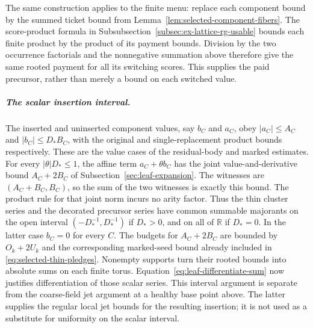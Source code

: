 The same construction applies to the finite menu: replace each
component bound by the summed ticket bound from
Lemma~\ref{lem:selected-component-fibers}. The score-product formula
in Subsubsection~\ref{subsec:ex-lattice-rg-usable} bounds each finite product
by the product of its payment bounds. Division by the two occurrence
factorials and the nonnegative summation above therefore give the
same rooted payment for all its switching scores. This supplies the
paid precursor, rather than merely a bound on each switched value.

\subparagraph{The scalar insertion interval.}
The inserted and uninserted component values, say $b_C$ and $a_C$,
obey $|a_C|\le A_C$ and $|b_C|\le D_* B_C$, with the original and
single-replacement product bounds respectively. These are the value
cases of the residual-body and marked estimates. For every
$|\theta|D_*\le1$, the affine term $a_C+\theta b_C$ has the joint
value-and-derivative bound $A_C+2B_C$ of
Subsection~\ref{sec:leaf-expansion}. The witnesses are
$(A_C+B_C,B_C)$, so the sum of the two witnesses is exactly this
bound. The product rule for that joint norm incurs no arity factor.
Thus the thin cluster series and the decorated precursor series have
common summable majorants on the open interval
$(-D_*^{-1},D_*^{-1})$ if $D_*>0$, and on all of $\mathbb R$ if
$D_*=0$. In the latter case $b_C=0$ for every $C$.
The budgets for $A_C+2B_C$ are bounded by $O_k+2U_k$ and the
corresponding marked-seed bound already included in
\eqref{eq:selected-thin-pledges}. Nonempty supports turn their
rooted bounds into absolute sums on each finite torus.
Equation~\eqref{eq:leaf-differentiate-sum} now justifies differentiation
of those scalar series. This interval argument is separate from the
coarse-field jet argument at a healthy base point above. The latter
supplies the regular local jet bounds for the resulting insertion;
it is not used as a substitute for uniformity on the scalar interval.

